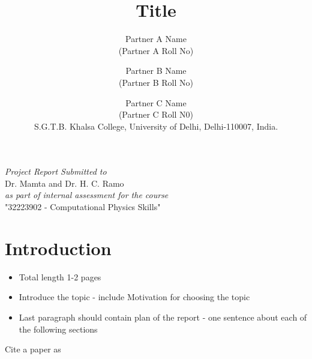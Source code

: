 \documentclass[12pt]{article}
\begin{document}
\baselineskip 0.7cm
\title{\bf \color{blue}Title }
\vskip 3cm
\author{Partner A Name \\ (Partner A Roll No) \and 
Partner B Name \\ (Partner B Roll No) \and 
Partner C Name \\ (Partner C Roll N0) \\
{\color{blue}S.G.T.B. Khalsa College, University of
Delhi, Delhi-110007, India.} }

\maketitle
\vskip 4cm
\begin{center}
{\it {\color{blue}Project Report Submitted to}}\\
Dr. Mamta and Dr. H. C. Ramo \\
\textit{\color{blue}as part of internal assessment for the course}\\
 "32223902 - Computational Physics Skills"
\end{center}


\newpage

\newpage
\tableofcontents
\newpage

\section{Introduction}
\label{sec:intro}
\begin{itemize}
    \item Total length 1-2 pages
    \item Introduce the topic - include Motivation for choosing the topic 
    \item Last paragraph should contain plan of the report -
one sentence about each of the following sections
\end{itemize}

Cite a paper as\cite{PhysRev.47.777}
\end{document}
